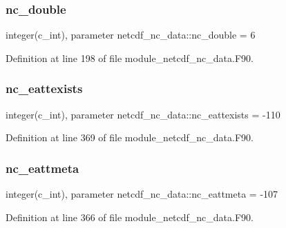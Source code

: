 \mbox{\label{namespacenetcdf__nc__data_ac0744e496a8eb335472d194685557cce}} 
\subsubsection{\texorpdfstring{nc\+\_\+double}{nc\_double}}
{\footnotesize\ttfamily integer(c\+\_\+int), parameter netcdf\+\_\+nc\+\_\+data\+::nc\+\_\+double = 6}



Definition at line 198 of file module\+\_\+netcdf\+\_\+nc\+\_\+data.\+F90.

\mbox{\label{namespacenetcdf__nc__data_ad0ebf9a9a2d73ffe3587ea832e5a0f68}} 
\subsubsection{\texorpdfstring{nc\+\_\+eattexists}{nc\_eattexists}}
{\footnotesize\ttfamily integer(c\+\_\+int), parameter netcdf\+\_\+nc\+\_\+data\+::nc\+\_\+eattexists = -\/110}



Definition at line 369 of file module\+\_\+netcdf\+\_\+nc\+\_\+data.\+F90.

\mbox{\label{namespacenetcdf__nc__data_a26356b327c9de1414e34445334d3fcad}} 
\subsubsection{\texorpdfstring{nc\+\_\+eattmeta}{nc\_eattmeta}}
{\footnotesize\ttfamily integer(c\+\_\+int), parameter netcdf\+\_\+nc\+\_\+data\+::nc\+\_\+eattmeta = -\/107}



Definition at line 366 of file module\+\_\+netcdf\+\_\+nc\+\_\+data.\+F90.

